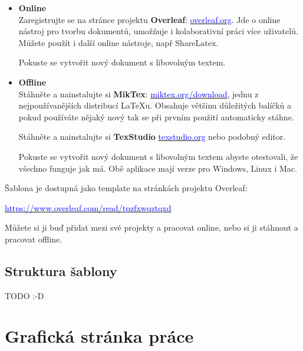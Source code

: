 \begin{itemize}

\item \textbf{Online}\\
Zaregistrujte se na stránce projektu \textbf{Overleaf}: \href{https://www.overleaf.com/signup?ref=e484ea92ee94}{\textcolor{blue}{overleaf.org}}. Jde o online nástroj pro tvorbu dokumentů, umožňuje i kolaborativní práci více uživatelů. Můžete použít i další online nástroje, např ShareLatex.

Pokuste se vytvořit nový dokument s libovolným textem.

\item \textbf{Offline}\\
Stáhněte a nainstalujte si \textbf{MikTex}: \href{https://miktex.org/download}{\textcolor{blue}{miktex.org/download}}, jednu z nejpoužívanějších distribucí LaTeXu. Obsahuje většinu důležitých balíčků a pokud používáte nějaký nový tak se při prvním použití automaticky stáhne.

Stáhněte a nainstalujte si \textbf{TexStudio} \href{https://www.texstudio.org/}{\textcolor{blue}{texstudio.org}} nebo podobný editor. 

Pokuste se vytvořit nový dokument s libovolným textem abyste otestovali, že všechno funguje jak má. Obě aplikace mají verze pro Windows, Linux i Mac.

\end{itemize}

Šablona je dostupná jako template na stránkách projektu Overleaf:
\vspace{-0.55cm}
\begin{center}
\large\href{https://www.texstudio.org/}{\textcolor{blue}{https://www.overleaf.com/read/tpzfxwqztqxd}}
\end{center}

\vspace{-0.2cm}
Můžete si ji buď přidat mezi své projekty a pracovat online, nebo si ji stáhnout a pracovat offline.


\section{Struktura \v{s}ablony}
TODO :-D




\chapter{Grafick\'{a} str\'{a}nka pr\'{a}ce}
\label{chap:grafika}


